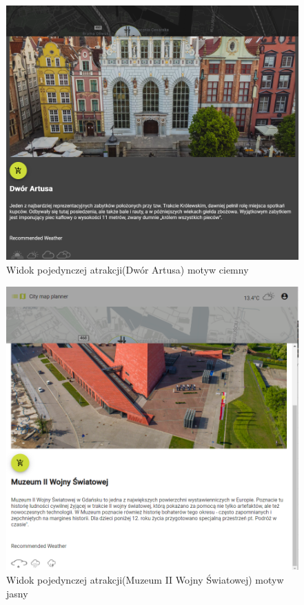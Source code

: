 \begin{figure}[H]
        \centering
        \includegraphics[width=1\textwidth]{attachments/atrakcjawidok}
        \caption{Widok pojedynczej atrakcji(Dwór Artusa) motyw ciemny}
        \label{fig:mapawidokx}
\end{figure}
\begin{figure}[H]
    \centering
    \includegraphics[width=1\textwidth]{attachments/atrakcjawidok-light}
    \caption{Widok pojedynczej atrakcji(Muzeum II Wojny Światowej) motyw jasny}
    \label{fig:mapawidok}
\end{figure}
